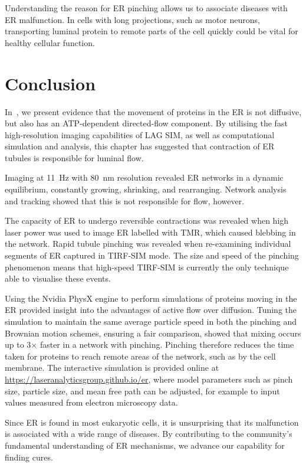 Understanding the reason for ER pinching allows us to associate diseases with ER malfunction.
In cells with long projections, such as motor neurons, transporting luminal protein to remote parts of the cell quickly could be vital for healthy cellular function.

\section{Conclusion}
In~\cite{holcman2018single}, we present evidence that the movement of proteins in the ER is not diffusive, but also has an ATP-dependent directed-flow component.
By utilising the fast high-resolution imaging capabilities of LAG SIM, as well as computational simulation and analysis, this chapter has suggested that contraction of ER tubules is responsible for luminal flow.

Imaging at \SI{11}{\hertz} with \SI{80}{\nano\metre} resolution revealed ER networks in a dynamic equilibrium, constantly growing, shrinking, and rearranging.
Network analysis and tracking showed that this is not responsible for flow, however.

The capacity of ER to undergo reversible contractions was revealed when high laser power was used to image ER labelled with TMR, which caused blebbing in the network.
Rapid tubule pinching was revealed when re-examining individual segments of ER captured in TIRF-SIM mode.
The size and speed of the pinching phenomenon means that high-speed TIRF-SIM is currently the only technique able to visualise these events.

Using the Nvidia PhysX engine to perform simulations of proteins moving in the ER provided insight into the advantages of active flow over diffusion.
Tuning the simulation to maintain the same average particle speed in both the pinching and Brownian motion schemes, ensuring a fair comparison, showed that mixing occurs up to 3$\times$ faster in a network with pinching.
Pinching therefore reduces the time taken for proteins to reach remote areas of the network, such as by the cell membrane.
The interactive simulation is provided online at \url{https://laseranalyticsgroup.github.io/er}, where model parameters such as pinch size, particle size, and mean free path can be adjusted, for example to input values measured from electron microscopy data. 

Since ER is found in most eukaryotic cells, it is unsurprising that its malfunction is associated with a wide range of diseases.
By contributing to the community's fundamental understanding of ER mechanisms, we advance our capability for finding cures.

